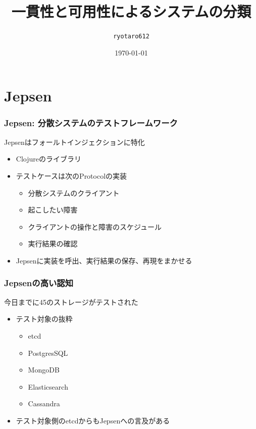 \documentclass[unicode, 14pt, aspectratio=169]{beamer}
\date{\today}
\title{一貫性と可用性によるシステムの分類}
\author{\texttt{ryotaro612}}
\begin{document}
\begin{frame}
\titlepage
\end{frame}
\section{Jepsen}
\begin{frame}
  \frametitle{Jepsen: 分散システムのテストフレームワーク\cite{jepsen}}
  {\large Jepsenはフォールトインジェクションに特化}
  \begin{itemize}
  \item Clojureのライブラリ
  \item テストケースは次のProtocolの実装
    \begin{itemize}
    \item 分散システムのクライアント
    \item 起こしたい障害
    \item クライアントの操作と障害のスケジュール
    \item 実行結果の確認
    \end{itemize}
  \item Jepsenに実装を呼出、実行結果の保存、再現をまかせる
  \end{itemize}
\end{frame}
\begin{frame}
  \frametitle{Jepsenの高い認知}
  {\large 今日までに45のストレージがテストされた\cite{jepsen-analysis}}
  \begin{itemize}
  \item テスト対象の抜粋
    \begin{itemize}
    \item etcd
    \item PostgresSQL
    \item MongoDB
    \item Elasticsearch
    \item Cassandra
    \end{itemize}
  \item テスト対象側のetcdからもJepsenへの言及がある\cite{jepsen-etcd}
  \end{itemize}
\end{frame}
\end{document}
